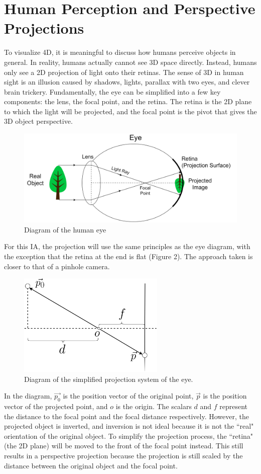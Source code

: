 \documentclass[12pt, letterpaper]{article}
\begin{document}
\section{Human Perception and Perspective Projections}
 To visualize 4D, it is meaningful to discuss how humans perceive objects in general. In reality, humans actually cannot see 3D space directly. Instead, humans only see a 2D projection of light onto their retinas. The sense of 3D in human sight is an illusion caused by shadows, lights, parallax with two eyes, and clever brain trickery. Fundamentally, the eye can be simplified into a few key components: the lens, the focal point, and the retina. The retina is the 2D plane to which the light will be projected, and the focal point is the pivot that gives the 3D object perspective.
\begin{figure}[H]
\centering
\includegraphics[width=12cm]{eye.png}
\caption{Diagram of the human eye}
\label{fig:figure}
\end{figure} 
For this IA, the projection will use the same principles as the eye diagram, with the exception that the retina at the end is flat (Figure 2). The approach taken is closer to that of a pinhole camera.
\begin{figure}[H]
\centering
\includegraphics[width=7cm]{simple_eye.png}
\caption{Diagram of the simplified projection system of the eye. }
\label{fig:figure}
\end{figure} 
In the diagram, $\vec{p_0}$ is the position vector of the original point, $\vec{p}$ is the position vector of the projected point, and $o$ is the origin. The scalars $d$ and $f$ represent the distance to the focal point and the focal distance respectively. However, the projected object is inverted, and inversion is not ideal because it is not the ``real" orientation of the original object. To simplify the projection process, the ``retina" (the 2D plane) will be moved to the front of the focal point instead. This still results in a perspective projection because the projection is still scaled by the distance between the original object and the focal point. 
\end{document}
